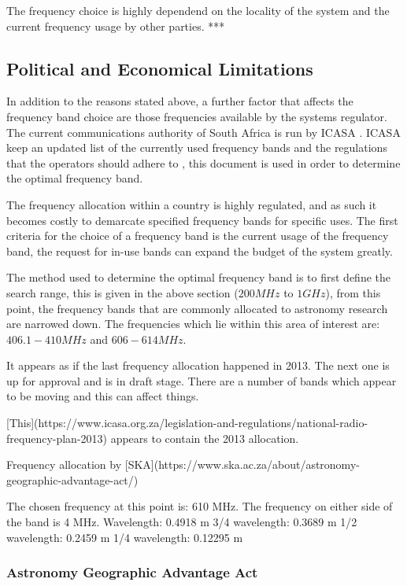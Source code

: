 \documentclass[11pt]{witseiepaper}
\begin{document}
The frequency choice is highly dependend on the locality of the system and the current frequency usage by other parties. ***


\subsection{Political and Economical Limitations} \label{PoliticalandEconomicalLimitations}

In addition to the reasons stated above, a further factor that affects the frequency band choice are those frequencies available by the systems regulator. The current communications authority of South Africa is run by ICASA \cite{ICASA}.
ICASA keep an updated list of the currently used frequency bands and the regulations that the operators should adhere to \cite{frequencyAllocation}, this document is used in order to determine the optimal frequency band.

The frequency allocation within a country is highly regulated, and as such it becomes costly to demarcate specified frequency bands for specific uses.
The first criteria for the choice of a frequency band is the current usage of the frequency band, the request for in-use bands can expand the budget of the system greatly.

The method used to determine the optimal frequency band is to first define the search range, this is given in the above section ($200 MHz$ to $1 GHz$), from this point, the frequency bands that are commonly allocated to astronomy research are narrowed down. The frequencies which lie within this area of interest are: $406.1 - 410 MHz$ and $606 - 614 MHz$. 




It appears as if the last frequency allocation happened in 2013.
The next one is up for approval and is in draft stage. There are a number of bands which appear to be moving and this can affect things.

[This](https://www.icasa.org.za/legislation-and-regulations/national-radio-frequency-plan-2013) appears to contain the 2013 allocation.

Frequency allocation by [SKA](https://www.ska.ac.za/about/astronomy-geographic-advantage-act/)

The chosen frequency at this point is: 610 MHz.
The frequency on either side of the band is 4 MHz.
Wavelength: 0.4918 m
3/4 wavelength: 0.3689 m
1/2 wavelength: 0.2459 m
1/4 wavelength: 0.12295 m

\subsubsection{Astronomy Geographic Advantage Act}
\end{document}

